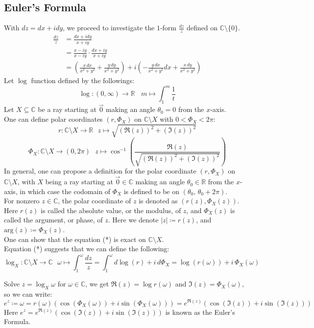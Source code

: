 \documentclass[11pt,oneside]{book}
\theoremstyle{break}
\theoremstyle{break}
\newcommand{\R}{\mathbb{R}}
\newcommand{\Complex}{\mathbb{C}}
\begin{document}
\subsection*{Euler's Formula}
With $dz = dx+idy$, we proceed to investigate the $1$-form $\frac{dz}{z}$ defined on $\Complex\setminus \{0\}$.
\begin{align*}
\frac{dz}{z} &= \frac{dx+i dy}{x+iy}\\
&= \frac{x-iy}{x-iy}\cdot \frac{dx + iy}{x+iy}\\
&= \left( \frac{x\, dx}{x^2+y^2} + \frac{y\, dy}{x^2+y^2}\right) +i\left(-\frac{y\, dx}{x^2+y^2} dx + \frac{x\, dy}{x^2+y^2}\right) \tag{*}
\end{align*}
Let $\log$ function defined by the followings:
$$\log: (0,\infty) \to \R \ \ \ \ m \mapsto \int_1^m \frac{1}{t}$$
Let $X\subseteq \Complex$ be a ray starting at $\vec{0}$ making an angle $\theta_0 = 0$ from the $x$-axis.\\ One can define polar coordinates $(r,\Phi_X)$ on $\Complex \setminus X$ with $0< \Phi_X < 2\pi$:
$$r:\Complex \setminus X\to \R \ \ \ z\mapsto \sqrt{(\Re(z))^2 + (\Im(z))^2}$$
$$\Phi_X: \Complex\setminus X \to (0,2\pi) \ \ \ z\mapsto \cos^{-1}\left(\frac{\Re{(z)}}{\sqrt{(\Re{(z)})^2+(\Im(z))^2}}\right)$$ 
In general, one can propose a definition for the polar coordinate $(r,\Phi_X)$ on $\Complex \setminus X$, with $X$ being a ray starting at $\vec{0}\in \Complex$ making an angle $\theta_0 \in \R$ from the $x$-axis, in which case the codomain of $\Phi_X$ is defined to be on $(\theta_0,\, \theta_0 + 2\pi)$. \\

For nonzero $z\in \Complex$, the polar coordinate of $z$ is denoted as $(r(z),\Phi_X(z))$. Here $r(z)$ is called the absolute value, or the modulus, of $z$, and $\Phi_X(z)$ is called the argument, or phase, of $z$. Here we denote $|z| \coloneqq r(z)$, and $\text{arg}(z) \coloneqq \Phi_X(z)$. \\


One can show that the equation (*) is exact on $\Complex \setminus X$.\\
Equation (*) suggests that we can define the following:
$$\log_X:\Complex\setminus X \to \Complex \ \ \ \omega \mapsto \int_1^\omega \frac{dz}{z} = \int_1^\omega d\log(r) + i\, d\Phi_X = \log (r(\omega)) + i\,\Phi_X(\omega)$$ 


Solve $z = \log_X \omega$ for $\omega \in \Complex$, we get $\Re(z) = \log r(\omega)$ and $\Im(z) = \Phi_X(\omega)$, so we can write:
$$e^z \coloneqq \omega = r(\omega)(\cos(\Phi_X(\omega)) + i\sin(\Phi_X(\omega))) = e^{\Re(z)} (\cos(\Im(z))+ i\sin(\Im(z)))$$
Here $e^z = e^{\Re(z)} (\cos(\Im(z))+ i\sin(\Im(z)))$ is known as the Euler's Formula.\\
\end{document}
